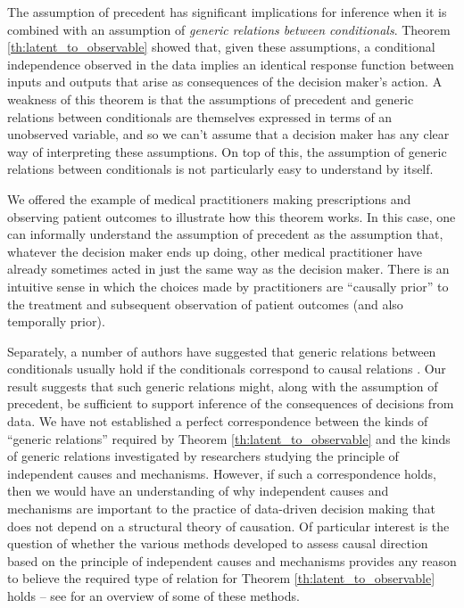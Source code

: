 The assumption of precedent has significant implications for inference when it is combined with an assumption of \emph{generic relations between conditionals}. Theorem \ref{th:latent_to_observable} showed that, given these assumptions, a conditional independence observed in the data implies an identical response function between inputs and outputs that arise as consequences of the decision maker's action. A weakness of this theorem is that the assumptions of precedent and generic relations between conditionals are themselves expressed in terms of an unobserved variable, and so we can't assume that a decision maker has any clear way of interpreting these assumptions. On top of this, the assumption of generic relations between conditionals is not particularly easy to understand by itself.

We offered the example of medical practitioners making prescriptions and observing patient outcomes to illustrate how this theorem works. In this case, one can informally understand the assumption of precedent as the assumption that, whatever the decision maker ends up doing, other medical practitioner have already sometimes acted in just the same way as the decision maker. There is an intuitive sense in which the choices made by practitioners are ``causally prior'' to the treatment and subsequent observation of patient outcomes (and also temporally prior).

Separately, a number of authors have suggested that generic relations between conditionals usually hold if the conditionals correspond to causal relations \citep{meek_strong_1995,lemeire_replacing_2013}. Our result suggests that such generic relations might, along with the assumption of precedent, be sufficient to support inference of the consequences of decisions from data. We have not established a perfect correspondence between the kinds of ``generic relations'' required by Theorem \ref{th:latent_to_observable} and the kinds of generic relations investigated by researchers studying the principle of independent causes and mechanisms. However, if such a correspondence holds, then we would have an understanding of why independent causes and mechanisms are important to the practice of data-driven decision making that does not depend on a structural theory of causation. Of particular interest is the question of whether the various methods developed to assess causal direction based on the principle of independent causes and mechanisms provides any reason to believe the required type of relation for Theorem \ref{th:latent_to_observable} holds -- see \citep{mooij_j.m._distinguishing_2016} for an overview of some of these methods.

